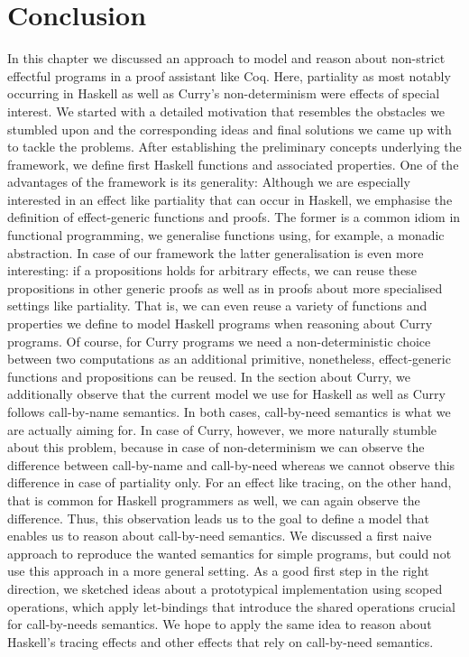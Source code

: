 \section{Conclusion}
\label{sec:conclusion}

In this chapter we discussed an approach to model and reason about non-strict effectful programs in a proof assistant like Coq.
Here, partiality as most notably occurring in Haskell as well as Curry's non-determinism were effects of special interest.
We started with a detailed motivation that resembles the obstacles we stumbled upon and the corresponding ideas and final solutions we came up with to tackle the problems.
After establishing the preliminary concepts underlying the  framework, we define first Haskell functions and associated properties.
One of the advantages of the framework is its generality: Although we are especially interested in an effect like partiality that can occur in Haskell, we emphasise the definition of effect-generic functions and proofs.
The former is a common idiom in functional programming, we generalise functions using, for example, a monadic abstraction.
In case of our framework the latter generalisation is even more interesting: if a propositions holds for arbitrary effects, we can reuse these propositions in other generic proofs as well as in proofs about more specialised settings like partiality.
That is, we can even reuse a variety of functions and properties we define to model Haskell programs when reasoning about Curry programs.
Of course, for Curry programs we need a non-deterministic choice between two computations as an additional primitive, nonetheless, effect-generic functions and propositions can be reused.
In the section about Curry, we additionally observe that the current model we use for Haskell as well as Curry follows call-by-name semantics.
In both cases, call-by-need semantics is what we are actually aiming for.
In case of Curry, however, we more naturally stumble about this problem, because in case of non-determinism we can observe the difference between call-by-name and call-by-need whereas we cannot observe this difference in case of partiality only.
For an effect like tracing, on the other hand, that is common for Haskell programmers as well, we can again observe the difference.
Thus, this observation leads us to the goal to define a model that enables us to reason about call-by-need semantics.
We discussed a first naive approach to reproduce the wanted semantics for simple programs, but could not use this approach in a more general setting.
As a good first step in the right direction, we sketched ideas about a prototypical implementation using scoped operations, which apply let-bindings that introduce the shared operations crucial for call-by-needs semantics.
We hope to apply the same idea to reason about Haskell's tracing effects and other effects that rely on call-by-need semantics.

